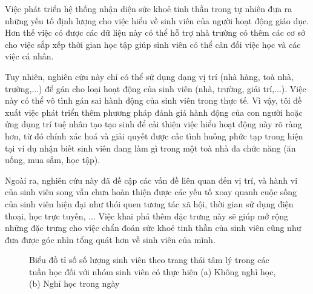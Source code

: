 Việc phát triển hệ thống nhận diện sức khoẻ tinh thần trong tự nhiên đưa ra những yếu tố định lượng cho việc hiểu về sinh viên của người hoạt động giáo dục. Hơn thế việc có được các dữ liệu này có thể hỗ trợ nhà trường có thêm các cơ sở cho việc sắp xếp thời gian học tập giúp sinh viên có thể cân đối việc học và các việc cá nhân.

Tuy nhiên, nghiên cứu này chỉ có thể sử dụng dạng vị trí (nhà hàng, toà nhà, trường,...) để gán cho loại hoạt động của sinh viên (nhà, trường, giải trí,...). Việc này có thể vô tình gán sai hành động của sinh viên trong thực tế. Vì vậy, tôi đề xuất việc phát triển thêm phương pháp đánh giá hành động của con người hoặc ứng dụng trí tuệ nhân tạo tạo sinh để cải thiện việc hiểu hoạt động này rõ ràng hơn, từ đó chính xác hoá và giải quyết được cấc tình huống phức tạp trong hiện tại ví dụ nhận biết sinh viên đang làm gì trong một toà nhà đa chức năng (ăn uống, mua sắm, học tập).

Ngoài ra, nghiên cứu này đã đề cập các vấn đề liên quan đến vị trí, và hành vi của sinh viên song vẫn chưa hoàn thiện được các yếu tố xoay quanh cuộc sống của sinh viên hiện đại như thói quen tương tác xã hội, thời gian sử dụng điện thoại, học trực tuyến, ... Việc khai phá thêm đặc trưng này sẽ giúp mở rộng những đặc trưng cho việc chẩn đoán sức khoẻ tinh thần của sinh viên cũng như đưa được góc nhìn tổng quát hơn về sinh viên của mình.

\begin{figure}[!ht]
\caption{Biểu đồ tỉ số số lượng sinh viên theo trang thái tâm lý trong các tuần học đối với nhóm sinh viên có thực hiện (a) Không nghỉ học, (b) Nghỉ học trong ngày}
\label{feat_imp}
\end{figure}

